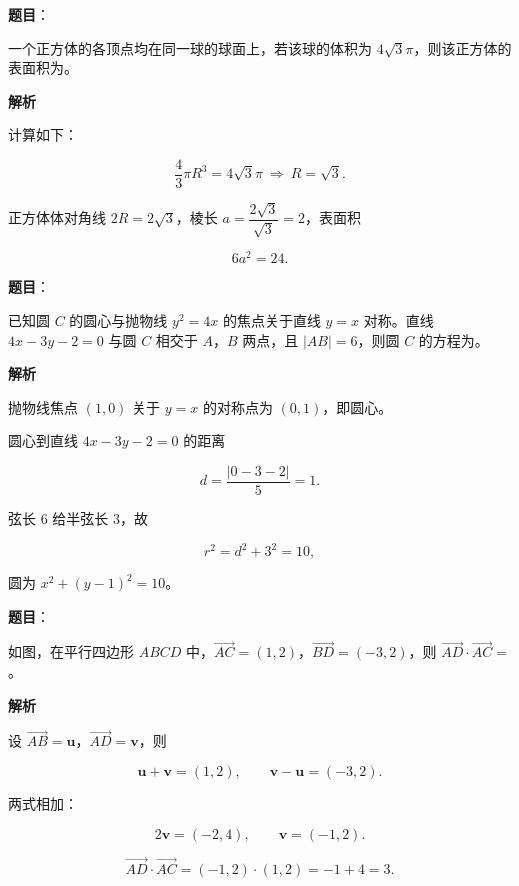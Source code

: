 \begin{answer}

\textbf{题目}：

一个正方体的各顶点均在同一球的球面上，若该球的体积为 $4\sqrt3\pi$，则该正方体的表面积为\gkblank{}。

\textbf{解析}

计算如下：

\nopagebreak[4]
\[\frac43\pi R^3=4\sqrt3\pi\ \Longrightarrow\ R=\sqrt3.\]

正方体体对角线 $2R=2\sqrt3$，棱长 $a=\dfrac{2\sqrt3}{\sqrt3}=2$，表面积

\nopagebreak[4]
\[6a^2=24.\]


\end{answer}
\begin{answer}

\textbf{题目}：

已知圆 $C$ 的圆心与抛物线 $y^2=4x$ 的焦点关于直线 $y=x$ 对称。直线 $4x-3y-2=0$ 与圆 $C$ 相交于 $A$，$B$ 两点，且 $|AB|=6$，则圆 $C$ 的方程为\gkblank{}。

\textbf{解析}

抛物线焦点 $(1,0)$ 关于 $y=x$ 的对称点为 $(0,1)$，即圆心。

圆心到直线 $4x-3y-2=0$ 的距离

\nopagebreak[4]
\[d=\frac{|0-3-2|}5=1.\]

弦长 $6$ 给半弦长 $3$，故

\nopagebreak[4]
\[r^2=d^2+3^2=10,\]

圆为 $x^2+(y-1)^2=10$。


\end{answer}
\begin{answer}

\textbf{题目}：

如图，在平行四边形 $ABCD$ 中，$\overrightarrow{AC}=(1,2)$，$\overrightarrow{BD}=(-3,2)$，则 $\overrightarrow{AD}\cdot\overrightarrow{AC}=$\gkblank{}。
\nopagebreak[4]
\begin{center}\end{center}
\nopagebreak[4]
\textbf{解析}

设 $\overrightarrow{AB}=\boldsymbol u$，$\overrightarrow{AD}=\boldsymbol v$，则

\nopagebreak[4]
\[\boldsymbol u+\boldsymbol v=(1,2),\qquad \boldsymbol v-\boldsymbol u=(-3,2).\]

两式相加：

\nopagebreak[4]
\[2\boldsymbol v=(-2,4),\qquad \boldsymbol v=(-1,2).\]

\nopagebreak[4]
\[\overrightarrow{AD}\cdot\overrightarrow{AC}=(-1,2)\cdot(1,2)=-1+4=3.\]


\end{answer}
